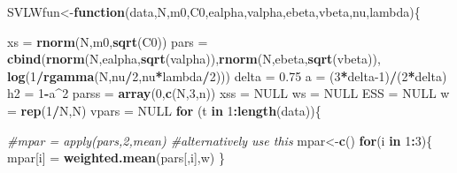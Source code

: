 \documentclass[
]{book}
\newenvironment{Shaded}{\begin{snugshade}}{\end{snugshade}}
\newcommand{\CommentTok}[1]{\textcolor[rgb]{0.56,0.35,0.01}{\textit{#1}}}
\newcommand{\ControlFlowTok}[1]{\textcolor[rgb]{0.13,0.29,0.53}{\textbf{#1}}}
\newcommand{\DecValTok}[1]{\textcolor[rgb]{0.00,0.00,0.81}{#1}}
\newcommand{\FloatTok}[1]{\textcolor[rgb]{0.00,0.00,0.81}{#1}}
\newcommand{\KeywordTok}[1]{\textcolor[rgb]{0.13,0.29,0.53}{\textbf{#1}}}
\newcommand{\NormalTok}[1]{#1}
\newcommand{\OperatorTok}[1]{\textcolor[rgb]{0.81,0.36,0.00}{\textbf{#1}}}
\newcommand{\OtherTok}[1]{\textcolor[rgb]{0.56,0.35,0.01}{#1}}
\newcommand{\StringTok}[1]{\textcolor[rgb]{0.31,0.60,0.02}{#1}}
\theoremstyle{break}
\theoremstyle{nonumberplain}
\begin{document}
\begin{Shaded}
\begin{Highlighting}[]
\NormalTok{SVLWfun<-}\ControlFlowTok{function}\NormalTok{(data,N,m0,C0,ealpha,valpha,ebeta,vbeta,nu,lambda)\{}
  
\NormalTok{  xs =}\StringTok{ }\KeywordTok{rnorm}\NormalTok{(N,m0,}\KeywordTok{sqrt}\NormalTok{(C0))}
\NormalTok{  pars   =}\StringTok{ }\KeywordTok{cbind}\NormalTok{(}\KeywordTok{rnorm}\NormalTok{(N,ealpha,}\KeywordTok{sqrt}\NormalTok{(valpha)),}\KeywordTok{rnorm}\NormalTok{(N,ebeta,}\KeywordTok{sqrt}\NormalTok{(vbeta)),}
                 \KeywordTok{log}\NormalTok{(}\DecValTok{1}\OperatorTok{/}\KeywordTok{rgamma}\NormalTok{(N,nu}\OperatorTok{/}\DecValTok{2}\NormalTok{,nu}\OperatorTok{*}\NormalTok{lambda}\OperatorTok{/}\DecValTok{2}\NormalTok{)))}
\NormalTok{  delta  =}\StringTok{ }\FloatTok{0.75}
\NormalTok{  a      =}\StringTok{ }\NormalTok{(}\DecValTok{3}\OperatorTok{*}\NormalTok{delta}\DecValTok{-1}\NormalTok{)}\OperatorTok{/}\NormalTok{(}\DecValTok{2}\OperatorTok{*}\NormalTok{delta)}
\NormalTok{  h2     =}\StringTok{ }\DecValTok{1}\OperatorTok{-}\NormalTok{a}\OperatorTok{^}\DecValTok{2}
\NormalTok{  parss  =}\StringTok{ }\KeywordTok{array}\NormalTok{(}\DecValTok{0}\NormalTok{,}\KeywordTok{c}\NormalTok{(N,}\DecValTok{3}\NormalTok{,n))}
\NormalTok{  xss    =}\StringTok{ }\OtherTok{NULL}
\NormalTok{  ws     =}\StringTok{ }\OtherTok{NULL}
\NormalTok{  ESS    =}\StringTok{ }\OtherTok{NULL}
\NormalTok{  w      =}\StringTok{ }\KeywordTok{rep}\NormalTok{(}\DecValTok{1}\OperatorTok{/}\NormalTok{N,N)}
\NormalTok{  vpars   =}\StringTok{ }\OtherTok{NULL}
  \ControlFlowTok{for}\NormalTok{ (t }\ControlFlowTok{in} \DecValTok{1}\OperatorTok{:}\KeywordTok{length}\NormalTok{(data))\{}
    
    \CommentTok{#mpar        = apply(pars,2,mean) #alternatively use this }
\NormalTok{    mpar<-}\KeywordTok{c}\NormalTok{()}
    \ControlFlowTok{for}\NormalTok{(i }\ControlFlowTok{in} \DecValTok{1}\OperatorTok{:}\DecValTok{3}\NormalTok{)\{}
\NormalTok{      mpar[i]    =}\StringTok{ }\KeywordTok{weighted.mean}\NormalTok{(pars[,i],w)}
\NormalTok{    \}}
    

\end{Highlighting}
\end{Shaded}
\end{document}
